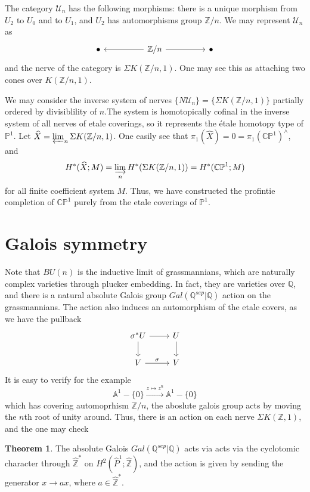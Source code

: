 \documentclass{article}
\theoremstyle{definition}
\newtheorem{theorem}{Theorem}[section]
\theoremstyle{definition}
\theoremstyle{definition}
\theoremstyle{definition}
\theoremstyle{definition}
\theoremstyle{definition}
\theoremstyle{definition}
\begin{document}
The category $\mathcal{U}_n$ has the following morphisms: there is a unique morphism from $U_2$ to $U_0$ and to $U_1$, and $U_2$ has automorphisms group $\mathbb{Z}/n$. We may represent  $\mathcal{U}_n$ as 
\[\begin{tikzcd}
	\bullet && {\mathbb{Z}/n} && \bullet
	\arrow[from=1-3, to=1-1]
	\arrow[from=1-3, to=1-5]
\end{tikzcd}\]
and the nerve of the category is $\Sigma K(\mathbb{Z}/n,1)$. One may see this as attaching two cones over $K(\mathbb{Z}/n,1)$. 


We may consider the inverse system of nerves $\{N\mathcal{U}_{n}\}=\{\Sigma K(\mathbb{Z}/n,1)\}$ partially ordered by divisiblility of $n$.The system is homotopically cofinal in the inverse system of all nerves of etale coverings, so it represents the \'etale homotopy type of $\mathbb{P}^1$. Let $\widehat{X}=\varprojlim_n \Sigma K(\mathbb{Z}/n,1)$. One easily see that $\pi_1(\widehat{X})=0=\pi_1(\mathbb{CP}^1)^{\wedge}$, and 
\[H^*(\widehat{X};M)=\varinjlim_n H^*(\Sigma K(\mathbb{Z}/n,1))=H^*(\mathbb{CP}^1;M)\]
for all finite coefficient system $M$. Thus, we have constructed the profintie completion of $\mathbb{CP}^1$ purely from the etale coverings of $\mathbb{P}^1$.

\section{Galois symmetry}
Note that $BU(n)$ is the inductive limit of grassmannians, which are naturally complex varieties through plucker embedding. In fact, they are varieties over $\mathbb{Q}$, and there is a natural absolute Galois group $Gal(\mathbb{Q}^{sep}|\mathbb{Q})$ action on the grassmannians. The action also induces an automorphism of the etale covers, as we have the pullback
\[\begin{tikzcd}
	{\sigma^*U} & U \\
	V & V
	\arrow[from=1-1, to=1-2]
	\arrow[from=1-1, to=2-1]
	\arrow[from=1-2, to=2-2]
	\arrow["\sigma", from=2-1, to=2-2]
\end{tikzcd}\]
It is easy to verify for the example 
\[\mathbb{A}^1-\{0\}\xrightarrow{z\mapsto z^n}\mathbb{A}^1-\{0\}\]
which has covering automoprhism $\mathbb{Z}/n$, the aboslute galois group acts by moving the $n$th root of unity around. Thus, there is an action on each nerve $\Sigma K(\mathbb{Z},1)$, and the one may check 


\begin{tcolorbox}[colback=red!5!white,colframe=red!30!white]
\begin{theorem}
The absolute Galois $Gal(\mathbb{Q}^{sep}|\mathbb{Q})$ acts via acts via the cyclotomic character through $\widehat{\mathbb{Z}}^*$ on $H^2(\widehat{P}^1;\widehat{\mathbb{Z}})$, and the action is given by sending the generator $x\to ax$, where $a\in \widehat{\mathbb{Z}}^*$.
\end{theorem}
\end{tcolorbox}
\end{document}
